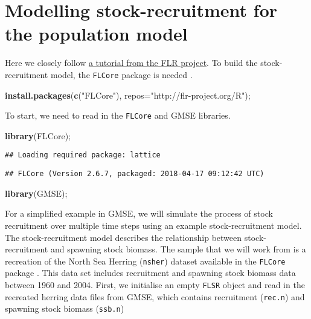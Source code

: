 \documentclass[]{article}
\newenvironment{Shaded}{\begin{snugshade}}{\end{snugshade}}
\newcommand{\KeywordTok}[1]{\textcolor[rgb]{0.13,0.29,0.53}{\textbf{{#1}}}}
\newcommand{\DataTypeTok}[1]{\textcolor[rgb]{0.13,0.29,0.53}{{#1}}}
\newcommand{\StringTok}[1]{\textcolor[rgb]{0.31,0.60,0.02}{{#1}}}
\newcommand{\NormalTok}[1]{{#1}}
\begin{document}
\section{Modelling stock-recruitment for the population
model}\label{modelling-stock-recruitment-for-the-population-model}

Here we closely follow
\href{http://www.flr-project.org/doc/Modelling_stock_recruitment_with_FLSR.html}{a
tutorial from the FLR project}. To build the stock-recruitment model,
the \texttt{FLCore} package is needed \citep{Kell2007}.

\begin{Shaded}
\begin{Highlighting}[]
\KeywordTok{install.packages}\NormalTok{(}\KeywordTok{c}\NormalTok{(}\StringTok{"FLCore"}\NormalTok{), }\DataTypeTok{repos=}\StringTok{"http://flr-project.org/R"}\NormalTok{);}
\end{Highlighting}
\end{Shaded}

To start, we need to read in the \texttt{FLCore} and GMSE libraries.

\begin{Shaded}
\begin{Highlighting}[]
\KeywordTok{library}\NormalTok{(FLCore);}
\end{Highlighting}
\end{Shaded}

\begin{verbatim}
## Loading required package: lattice
\end{verbatim}

\begin{verbatim}
## FLCore (Version 2.6.7, packaged: 2018-04-17 09:12:42 UTC)
\end{verbatim}

\begin{Shaded}
\begin{Highlighting}[]
\KeywordTok{library}\NormalTok{(GMSE);}
\end{Highlighting}
\end{Shaded}

For a simplified example in GMSE, we will simulate the process of stock
recruitment over multiple time steps using an example stock-recruitment
model. The stock-recruitment model describes the relationship between
stock-recruitment and spawning stock biomass. The sample that we will
work from is a recreation of the North Sea Herring (\texttt{nsher})
dataset available in the \texttt{FLCore} package \citep{Kell2007}. This
data set includes recruitment and spawning stock biomass data between
1960 and 2004. First, we initialise an empty \texttt{FLSR} object and
read in the recreated herring data files from GMSE, which contains
recruitment (\texttt{rec.n}) and spawning stock biomass (\texttt{ssb.n})
\end{document}
